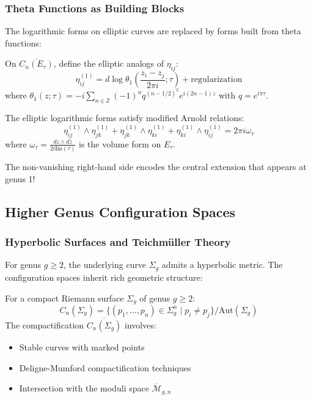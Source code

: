 \subsubsection{Theta Functions as Building Blocks}

The logarithmic forms on elliptic curves are replaced by forms built from theta functions:

\begin{definition}
On $\overline{C_n(E_\tau)}$, define the elliptic analogs of $\eta_{ij}$:
\[
\eta_{ij}^{(1)} = d\log\theta_1\left(\frac{z_i - z_j}{2\pi i}; \tau\right) + \text{regularization}
\]
where $\theta_1(z; \tau) = -i\sum_{n \in \mathbb{Z}}(-1)^n q^{(n-1/2)^2}e^{i(2n-1)z}$ with $q = e^{i\pi\tau}$.
\end{definition}

\begin{proposition}
The elliptic logarithmic forms satisfy modified Arnold relations:
\[
\eta_{ij}^{(1)} \wedge \eta_{jk}^{(1)} + \eta_{jk}^{(1)} \wedge \eta_{ki}^{(1)} + \eta_{ki}^{(1)} \wedge \eta_{ij}^{(1)} = 2\pi i \omega_\tau
\]
where $\omega_\tau = \frac{dz \wedge d\bar{z}}{2i\text{Im}(\tau)}$ is the volume form on $E_\tau$.
\end{proposition}

The non-vanishing right-hand side encodes the central extension that appears at genus 1!

\subsection{Higher Genus Configuration Spaces}

\subsubsection{Hyperbolic Surfaces and Teichmüller Theory}

For genus $g \geq 2$, the underlying curve $\Sigma_g$ admits a hyperbolic metric. The configuration spaces inherit rich geometric structure:

\begin{definition}
For a compact Riemann surface $\Sigma_g$ of genus $g \geq 2$:
\[
C_n(\Sigma_g) = \{(p_1, \ldots, p_n) \in \Sigma_g^n \mid p_i \neq p_j\}/\text{Aut}(\Sigma_g)
\]
The compactification $\overline{C_n(\Sigma_g)}$ involves:
\begin{itemize}
\item Stable curves with marked points
\item Deligne-Mumford compactification techniques
\item Intersection with the moduli space $\overline{\mathcal{M}}_{g,n}$
\end{itemize}
\end{definition}

